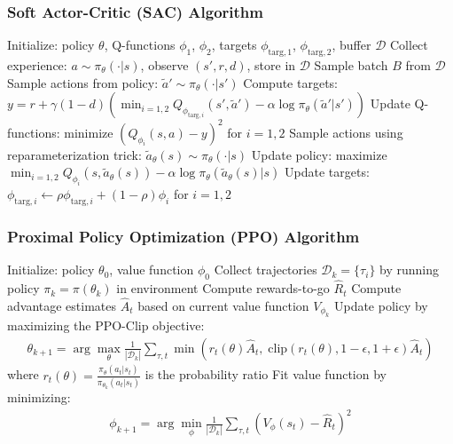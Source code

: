 \begin{frame}
    \frametitle{Soft Actor-Critic (SAC) Algorithm}
    \vspace{-0.25cm}
    \begin{algorithmic}[1]
    \STATE Initialize: policy $\theta$, Q-functions $\phi_1$, $\phi_2$, targets $\phi_{\text{targ},1}$, $\phi_{\text{targ},2}$, buffer $\mathcal{D}$
    \REPEAT
        \STATE Collect experience: $a \sim \pi_{\theta}(\cdot|s)$, observe $(s',r,d)$, store in $\mathcal{D}$
            \STATE Sample batch $B$ from $\mathcal{D}$
            \STATE Sample actions from policy: $\tilde{a}' \sim \pi_{\theta}(\cdot|s')$
            \STATE Compute targets: $y = r + \gamma (1-d) \left(\min_{i=1,2} Q_{\phi_{\text{targ}, i}} (s', \tilde{a}') - \alpha \log \pi_{\theta}(\tilde{a}'|s')\right)$
            \STATE Update Q-functions: minimize $(Q_{\phi_i}(s,a) - y)^2$ for $i=1,2$
            \STATE Sample actions using reparameterization trick: $\tilde{a}_{\theta}(s) \sim \pi_{\theta}(\cdot|s)$
            \STATE Update policy: maximize $\min_{i=1,2} Q_{\phi_i}(s, \tilde{a}_{\theta}(s)) - \alpha \log \pi_{\theta}(\tilde{a}_{\theta}(s)|s)$
            \STATE Update targets: $\phi_{\text{targ},i} \leftarrow \rho \phi_{\text{targ},i} + (1-\rho) \phi_i$ for $i=1,2$
        \ENDIF
    \end{algorithmic}
\end{frame}

\begin{frame}
    \frametitle{Proximal Policy Optimization (PPO) Algorithm}
    \vspace{-0.25cm}
    \begin{algorithmic}[1]
    \STATE Initialize: policy $\theta_0$, value function $\phi_0$
        \STATE Collect trajectories ${\mathcal D}_k = \{\tau_i\}$ by running policy $\pi_k = \pi(\theta_k)$ in environment
        \STATE Compute rewards-to-go $\hat{R}_t$
        \STATE Compute advantage estimates $\hat{A}_t$ based on current value function $V_{\phi_k}$
        \STATE Update policy by maximizing the PPO-Clip objective:
        \begin{align*}
            \theta_{k+1} = \arg \max_{\theta} \frac{1}{|{\mathcal D}_k|} \sum_{\tau, t} \min\left(
                r_t(\theta) \hat{A}_t, \; \text{clip}(r_t(\theta), 1-\epsilon, 1+\epsilon) \hat{A}_t
            \right)
        \end{align*}
        where $r_t(\theta) = \frac{\pi_{\theta}(a_t|s_t)}{\pi_{\theta_k}(a_t|s_t)}$ is the probability ratio
        \STATE Fit value function by minimizing:
        \begin{align*}
            \phi_{k+1} = \arg \min_{\phi} \frac{1}{|{\mathcal D}_k|} \sum_{\tau, t}\left( V_{\phi}(s_t) - \hat{R}_t \right)^2
        \end{align*}
    \ENDFOR
    \end{algorithmic}
\end{frame}